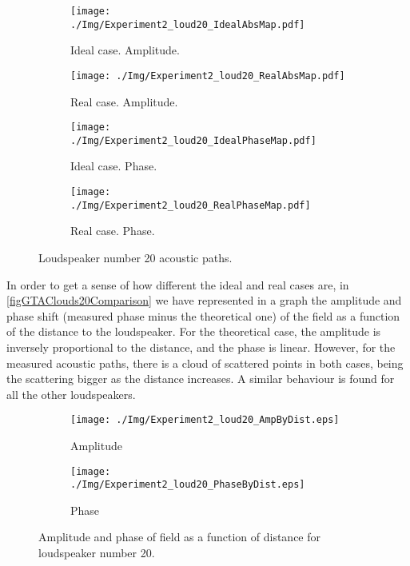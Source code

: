 \begin{figure}
	\centering
	\begin{subfigure}[b]{0.24\textwidth}
		\centering
		\texttt{[image: ./Img/Experiment2\_loud20\_IdealAbsMap.pdf]}
		\caption{Ideal case. Amplitude.}
		\label{figGTAClouds20idealCaseAbs}
	\end{subfigure}
		\begin{subfigure}[b]{0.24\textwidth}
		\centering
		\texttt{[image: ./Img/Experiment2\_loud20\_RealAbsMap.pdf]}
		\caption{Real case. Amplitude.}
		\label{figGTAClouds20idealCasePhase}		
	\end{subfigure}
	\begin{subfigure}[b]{0.24\textwidth}
		\centering
		\texttt{[image: ./Img/Experiment2\_loud20\_IdealPhaseMap.pdf]}
		\caption{Ideal case. Phase.}
		\label{figGTAClouds20realCaseAbs}
	\end{subfigure}
	\begin{subfigure}[b]{0.24\textwidth}
		\centering
		\texttt{[image: ./Img/Experiment2\_loud20\_RealPhaseMap.pdf]}
		\caption{Real case. Phase.}
		\label{figGTAClouds20realCasePhase}
	\end{subfigure}
	\caption{Loudspeaker number 20 acoustic paths.}
	\label{figGTAClouds20}
\end{figure}

In order to get a sense of how different the ideal and real cases are, in \autoref{figGTAClouds20Comparison} we have represented in a graph the amplitude and phase shift (measured phase minus the theoretical one) of the field as a function of the distance to the loudspeaker. For the theoretical case, the amplitude is inversely proportional to the distance, and the phase is linear. However, for the measured acoustic paths, there is a cloud of scattered points in both cases, being the scattering bigger as the distance increases. A similar behaviour is found for all the other loudspeakers.

\begin{figure}
	\begin{subfigure}[b]{0.49\textwidth}
		\centering
		\texttt{[image: ./Img/Experiment2\_loud20\_AmpByDist.eps]}
		\caption{Amplitude}
	\end{subfigure}
	\begin{subfigure}[b]{0.49\textwidth}
		\centering
		\texttt{[image: ./Img/Experiment2\_loud20\_PhaseByDist.eps]}
		\caption{Phase}
	\end{subfigure}
	\caption{Amplitude and phase of field as a function of distance for loudspeaker number 20.}
	\label{figGTAClouds20Comparison}
\end{figure}

